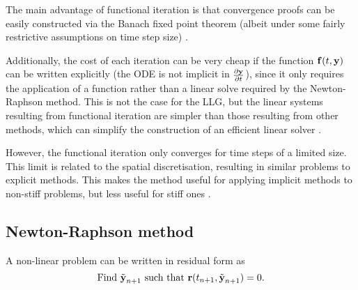 The main advantage of functional iteration is that convergence proofs can be easily constructed via the Banach fixed point theorem (albeit under some fairly restrictive assumptions on time step size) \cite[125]{Iserles2009}.

Additionally, the cost of each iteration can be very cheap if the function ${\boldsymbol{\mathrm{f}}}(t, \boldsymbol{\mathrm{y}})$ can be written explicitly (\ie the ODE is not implicit in $\frac{\partial \boldsymbol{\mathrm{y}}}{\partial t}$), since it only requires the application of a function rather than a linear solve required by the Newton-Raphson method.
This is not the case for the LLG, but the linear systems resulting from functional iteration are simpler than those resulting from other methods, which can simplify the construction of an efficient linear solver \cite{Bartels2006}.

However, the functional iteration only converges for time steps of a limited size.
This limit is related to the spatial discretisation, resulting in similar problems to explicit methods.
This makes the method useful for applying implicit methods to non-stiff problems, but less useful for stiff ones \cite{Iserles2009}.


\subsection{Newton-Raphson method}
\label{sec:newt-raph}

A non-linear problem can be written in residual form as
\begin{equation}
  \text{Find $\tilde{\boldsymbol{\mathrm{y}}}_{n+1}$ such that } \boldsymbol{\mathrm{r}}(t_{n+1}, \tilde{\boldsymbol{\mathrm{y}}}_{n+1}) = 0.
\end{equation}

